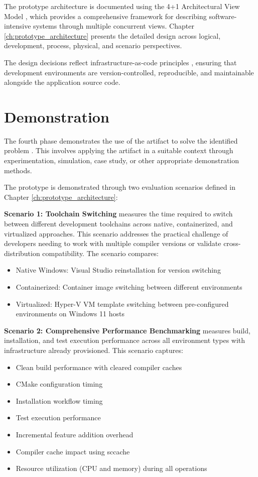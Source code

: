 The prototype architecture is documented using the 4+1 Architectural View Model \citep{kruchten4+1ViewModel1995}, which provides a comprehensive framework for describing software-intensive systems through multiple concurrent views.
Chapter \ref{ch:prototype_architecture} presents the detailed design across logical, development, process, physical, and scenario perspectives.

The design decisions reflect infrastructure-as-code principles \citep{humbleContinuousDeliveryReliable2011}, ensuring that development environments are version-controlled, reproducible, and maintainable alongside the application source code.

\section{Demonstration}

The fourth phase demonstrates the use of the artifact to solve the identified problem \citep{peffersDesignScienceResearch2007}.
This involves applying the artifact in a suitable context through experimentation, simulation, case study, or other appropriate demonstration methods.

The prototype is demonstrated through two evaluation scenarios defined in Chapter \ref{ch:prototype_architecture}:

\textbf{Scenario 1: Toolchain Switching} measures the time required to switch between different development toolchains across native, containerized, and virtualized approaches.
This scenario addresses the practical challenge of developers needing to work with multiple compiler versions or validate cross-distribution compatibility.
The scenario compares:
\begin{itemize}
	\item Native Windows: Visual Studio reinstallation for version switching
	\item Containerized: Container image switching between different environments
	\item Virtualized: Hyper-V VM template switching between pre-configured environments on Windows 11 hosts
\end{itemize}

\newpage
\textbf{Scenario 2: Comprehensive Performance Benchmarking} measures build, installation, and test execution performance across all environment types with infrastructure already provisioned.
This scenario captures:
\begin{itemize}
	\item Clean build performance with cleared compiler caches
	\item CMake configuration timing
	\item Installation workflow timing
	\item Test execution performance
	\item Incremental feature addition overhead
	\item Compiler cache impact using sccache
	\item Resource utilization (CPU and memory) during all operations
\end{itemize}

